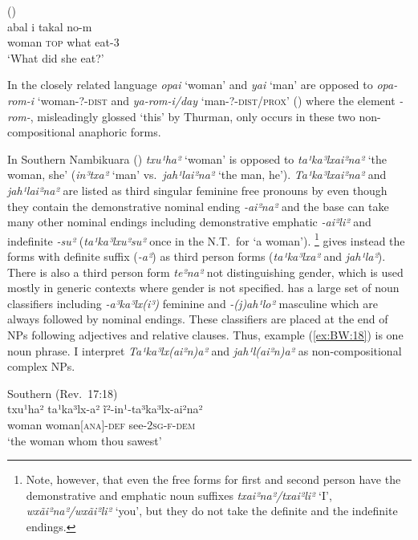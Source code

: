 \documentclass[output=collectionpaper]{langsci/langscibook}
\begin{document}
\ea\label{ex:BW:17}
 (\citealt[35]{Lee2005})\\
\gll abal 	i 	takal 	no-m \\
woman	\textsc{top} 	what 	eat-3\\
\glt ‘What did she eat?’\\
\z

In the closely related language  \textit{opai} ‘woman’ and \textit{yai} ‘man’ are opposed to \textit{opa-rom-i} ‘woman-?-\textsc{dist} and \textit{ya-rom-i/day} ‘man-?-\textsc{dist/prox}’ (\citealt{Thurman1987}) where the element \textit{-rom-}, misleadingly glossed ‘this’ by Thurman, only occurs in these two non-compositional anaphoric forms.

In Southern {Nambikuara} () \textit{txu¹ha²} ‘woman’ is opposed to \textit{ta¹ka³lxai²na²} ‘the woman, she’ (\textit{in³txa²} ‘man’ vs.\ \textit{jah¹lai²na²} ‘the man, he’). \textit{Ta¹ka³lxai²na²} and \textit{jah¹lai²na²} are listed as third singular feminine free pronouns by \citet[283]{Lowe1999} even though they contain the demonstrative nominal ending \textit{-ai²na²} and the base can take many other nominal endings including demonstrative emphatic \mbox{\textit{-ai²li²}} and indefinite \textit{-su²} (\textit{ta¹ka³lxu²su²} once in the N.T.\ for ‘a woman’).%
\footnote{%
Note, however, that even the free forms for first and second person have the demonstrative and emphatic noun suffixes \textit{txai²na²/txai²li²} ‘I’, \textit{wxãi²na²/wxãi²li²} ‘you’, but they do not take the definite and the indefinite endings.
} %
\citet[71]{Kroeker2001} gives instead the forms with definite suffix (\textit{-a²}) as third person forms (\textit{ta¹ka³lxa²} and \textit{jah¹la²}). There is also a third person form \textit{te²na²} not distinguishing gender, which is used mostly in generic contexts where gender is not specified.  has a large set of noun classifiers including \textit{-a³ka³lx(i³)} feminine and \textit{-(j)ah¹lo²} masculine which are always followed by nominal endings. These classifiers are placed at the end of NPs following adjectives and relative clauses. Thus, example (\ref{ex:BW:18}) is one noun phrase. I interpret \textit{Ta¹ka³lx(ai²n)a²} and \textit{jah¹l(ai²n)a²} as non-compositional complex NPs.

\ea\label{ex:BW:18}
Southern  (Rev.~17:18)\\
\gll txu¹ha²	ta¹ka³lx-a²	ĩ²-in¹-ta³ka³lx-ai²na²	\\
woman	woman[\textsc{ana}]-\textsc{def}	see-\textsc{2sg-f-dem}\\
\glt ‘the woman whom thou sawest’\\
\z
\end{document}
